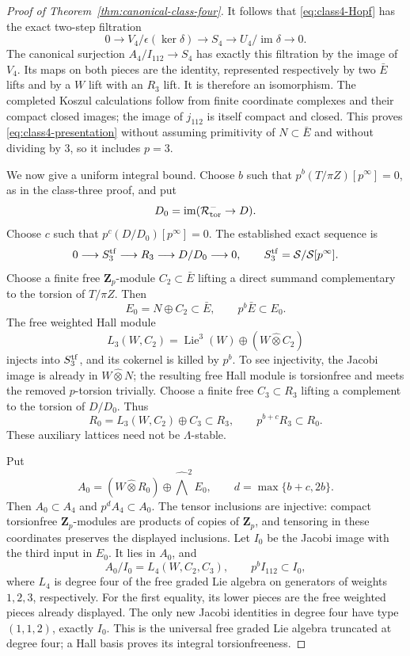 \begin{proof}[Proof of Theorem~\ref{thm:canonical-class-four}]
It follows that \eqref{eq:class4-Hopf} has the exact
two-step filtration
\[
 0\longrightarrow V_4/\epsilon(\ker\delta)
 \longrightarrow S_4
 \longrightarrow U_4/\operatorname{im}\delta
 \longrightarrow0.
\]
The canonical surjection $A_4/I_{112}\to S_4$ has
exactly this filtration by the image of $V_4$.
Its maps on both pieces are the identity, represented
respectively by two $\bar E$ lifts and by a $W$ lift
with an $R_3$ lift. It is therefore an isomorphism.
The completed Koszul calculations follow from finite
coordinate complexes and their compact closed images;
the image of $j_{112}$ is itself compact and closed.
This proves \eqref{eq:class4-presentation} without
assuming primitivity of $N\subset\bar E$ and without
dividing by $3$, so it includes $p=3$.

We now give a uniform integral bound. Choose $b$ such
that $p^b(T/\pi Z)[p^\infty]=0$, as in the class-three
proof, and put
\[
 D_0=\operatorname{im}(\mathcal R_{\rm tor}^-\to D).
\]
Choose $c$ such that $p^c(D/D_0)[p^\infty]=0$.
The established exact sequence is
\[
 0\longrightarrow S_3^{\rm tf}\longrightarrow R_3
 \longrightarrow D/D_0\longrightarrow0,
 \qquad S_3^{\rm tf}=\mathcal S/\mathcal S[p^\infty].
\]
Choose a finite free $\mathbf Z_p$-module $C_2\subset\bar E$
lifting a direct summand complementary to the torsion
of $T/\pi Z$. Then
\[
 E_0=N\oplus C_2\subset\bar E,\qquad p^b\bar E\subset E_0.
\]
The free weighted Hall module
\[
 L_3(W,C_2)=\operatorname{Lie}^3(W)
                      \oplus(W\widehat\otimes C_2)
\]
injects into $S_3^{\rm tf}$, and its cokernel is killed
by $p^b$. To see injectivity, the Jacobi image is already
in $W\widehat\otimes N$; the resulting free Hall module
is torsionfree and meets the removed $p$-torsion trivially.
Choose a finite free $C_3\subset R_3$ lifting a complement
to the torsion of $D/D_0$. Thus
\[
 R_0=L_3(W,C_2)\oplus C_3\subset R_3,
 \qquad p^{b+c}R_3\subset R_0.
\]
These auxiliary lattices need not be $\Lambda$-stable.

Put
\[
 A_0=(W\widehat\otimes R_0)\oplus
                          \widehat\bigwedge^2E_0,
 \qquad d=\max\{b+c,2b\}.
\]
Then $A_0\subset A_4$ and $p^dA_4\subset A_0$.
The tensor inclusions are injective: compact torsionfree
$\mathbf Z_p$-modules are products of copies of
$\mathbf Z_p$, and tensoring in these coordinates
preserves the displayed inclusions. Let $I_0$ be the
Jacobi image with the third input in $E_0$. It lies in
$A_0$, and
\[
 A_0/I_0=L_4(W,C_2,C_3),\qquad p^bI_{112}\subset I_0,
\]
where $L_4$ is degree four of the free graded Lie algebra
on generators of weights $1,2,3$, respectively.
For the first equality, its lower pieces are the free
weighted pieces already displayed. The only new Jacobi
identities in degree four have type $(1,1,2)$, exactly
$I_0$. This is the universal free graded Lie algebra
truncated at degree four; a Hall basis proves its
integral torsionfreeness.


\end{proof}
